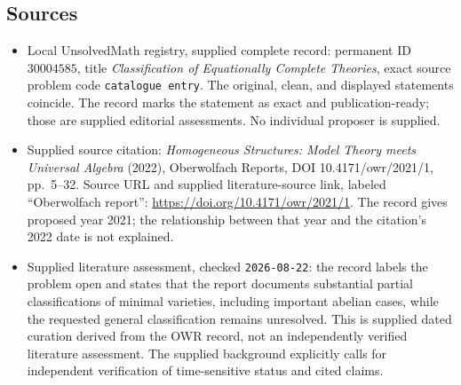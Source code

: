\documentclass[11pt]{article}
\begin{document}
\subsection{Sources}
\begin{itemize}
\item Local UnsolvedMath registry, supplied complete record: permanent ID \(30004585\), title \emph{Classification of Equationally Complete Theories}, exact source problem code \texttt{catalogue entry}. The original, clean, and displayed statements coincide. The record marks the statement as exact and publication-ready; those are supplied editorial assessments. No individual proposer is supplied.
\item Supplied source citation: \emph{Homogeneous Structures: Model Theory meets Universal Algebra} (2022), Oberwolfach Reports, DOI 10.4171/owr/2021/1, pp.\ 5--32. Source URL and supplied literature-source link, labeled ``Oberwolfach report'': \url{https://doi.org/10.4171/owr/2021/1}. The record gives proposed year 2021; the relationship between that year and the citation's 2022 date is not explained.
\item Supplied literature assessment, checked \texttt{2026-08-22}: the record labels the problem open and states that the report documents substantial partial classifications of minimal varieties, including important abelian cases, while the requested general classification remains unresolved. This is supplied dated curation derived from the OWR record, not an independently verified literature assessment. The supplied background explicitly calls for independent verification of time-sensitive status and cited claims.
\end{itemize}
\end{document}
